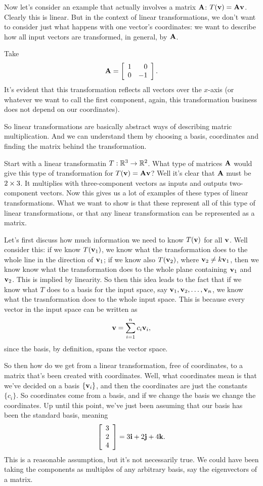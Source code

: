 \begin{example}
  Now let's consider an example that actually involves a matrix $\boldsymbol{\mathbf{A}}$: $T(\boldsymbol{\mathbf{v}})=\boldsymbol{\mathbf{A}}\boldsymbol{\mathbf{v}}$. Clearly this is linear. But in the context of linear transformations, we don't want to consider just what happens with one vector's coordinates: we want to describe how all input vectors are transformed, in general, by $\boldsymbol{\mathbf{A}}$.

Take
\[ \boldsymbol{\mathbf{A}} = \left[ \begin{array}{rrrrrrrrrrrrrrrrrrrrrrrrr} 1&0\\0&-1\\ \end{array} \right]. \]
It's evident that this transformation reflects all vectors over the $x$-axis (or whatever we want to call the first component, again, this transformation business does not depend on our coordinates).
\end{example}

So linear transformations are basically abstract ways of describing matric multiplication. And we can understand them by choosing a basis, coordinates and finding the matrix behind the transformation.

Start with a linear transformatin $T:\mathbb{R}^3\to\mathbb{R}^2$. What type of matrices $\boldsymbol{\mathbf{A}}$ would give this type of transformation for $T(\boldsymbol{\mathbf{v}}) = \boldsymbol{\mathbf{A}}\boldsymbol{\mathbf{v}}$? Well it's clear that $\boldsymbol{\mathbf{A}}$ must be $2 \times 3$. It multiplies with three-component vectors as inputs and outputs two-component vectors. Now this gives us a lot of examples of these types of linear transformations. What we want to show is that these represent all of this type of linear transformations, or that any linear transformation can be represented as a matrix. 

Let's first discuss how much information we need to know $T(\boldsymbol{\mathbf{v}})$ for all $\boldsymbol{\mathbf{v}}$. Well consider this: if we know $T(\boldsymbol{\mathbf{v}}_1)$, we know what the transformation does to the whole line in the direction of $\boldsymbol{\mathbf{v}}_1$; if we know also $T(\boldsymbol{\mathbf{v}}_2)$, where $\boldsymbol{\mathbf{v}}_2 \ne k\boldsymbol{\mathbf{v}}_1$, then we know know what the transformation does to the whole plane containing $\boldsymbol{\mathbf{v}}_1$ and $\boldsymbol{\mathbf{v}}_2$. This is implied by linearity. So then this idea leads to the fact that if we know what $T$ does to a basis for the input space, say $\boldsymbol{\mathbf{v}}_1, \boldsymbol{\mathbf{v}}_2, \ldots, \boldsymbol{\mathbf{v}}_n$, we know what the trasnformation does to the whole input space. This is because every vector in the input space can be written as
\[ \boldsymbol{\mathbf{v}} = \sum_{i=1}^n c_i \boldsymbol{\mathbf{v}}_i, \]
since the basis, by definition, spans the vector space.

So then how do we get from a linear transformation, free of coordinates, to a matrix that's been created with coordinates. Well, what coordinates mean is that we've decided on a basis $\{\boldsymbol{\mathbf{v}}_i\}$, and then the coordinates are just the constants $\{c_i\}$. So coordinates come from a basis, and if we change the basis we change the coordinates. Up until this point, we've just been assuming that our basis has been the standard basis, meaning
\[ \left[ \begin{array}{rrrrrrrrrrrrrrrrrrrrrrrrr} 3\\2\\4\\ \end{array} \right] = 3\boldsymbol{\mathbf{i}} + 2\boldsymbol{\mathbf{j}} + 4\boldsymbol{\mathbf{k}}. \]
This is a reasonable assumption, but it's not necessarily true. We could have been taking the components as multiples of any arbitrary basis, say the eigenvectors of a matrix. 

